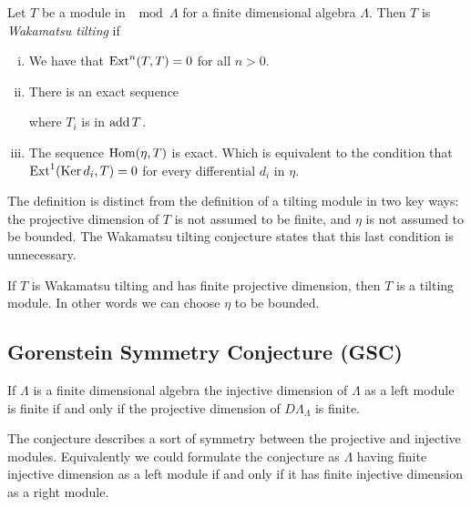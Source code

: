 \begin{defn}
	Let $T$ be a module in $\mod\Lambda$ for a finite dimensional algebra $\Lambda$. Then $T$ is \emph{Wakamatsu tilting} if
	\begin{enumerate}[i)]
		\item We have that $\operatorname{Ext}^n(T,T)=0$ for all $n >0$.
		\item There is an exact sequence 
		\begin{center}
		\end{center}
		where $T_i$ is in $\operatorname{add} T$.
		\item The sequence $\operatorname{Hom}(\eta, T)$ is exact. Which is equivalent to the condition that $\operatorname{Ext}^1(\operatorname{Ker} d_i, T)=0$ for every differential $d_i$ in $\eta$.
	\end{enumerate}
\end{defn}

The definition is distinct from the definition of a tilting module in two key ways: the projective dimension of $T$ is not assumed to be finite, and $\eta$ is not assumed to be bounded. The Wakamatsu tilting conjecture states that this last condition is unnecessary.

\begin{conj} 
	If $T$ is Wakamatsu tilting and has finite projective dimension, then $T$ is a tilting module. In other words we can choose $\eta$ to be bounded.
\end{conj}

\subsection*{Gorenstein Symmetry Conjecture (GSC)}
\begin{conj} 
	If $\Lambda$ is a finite dimensional algebra the injective dimension of $\Lambda$ as a left module is finite if and only if the projective dimension of $D\Lambda_\Lambda$ is finite.
\end{conj}

The conjecture describes a sort of symmetry between the projective and injective modules. Equivalently we could formulate the conjecture as $\Lambda$ having finite injective dimension as a left module if and only if it has finite injective dimension as a right module.

